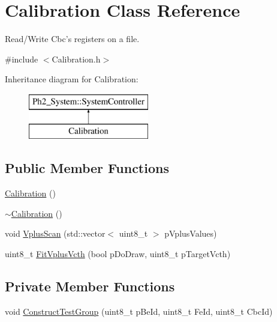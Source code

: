 \hypertarget{class_calibration}{\section{Calibration Class Reference}
\label{class_calibration}
}


Read/\-Write Cbc's registers on a file.  




{\ttfamily \#include $<$Calibration.\-h$>$}

Inheritance diagram for Calibration\-:\begin{figure}[H]
\begin{center}
\leavevmode
\includegraphics[height=2.000000cm]{class_calibration}
\end{center}
\end{figure}
\subsection*{Public Member Functions}
\begin{DoxyCompactItemize}
\item 
\hyperlink{class_calibration_a80f51a5ff7ec0f44d5388c9a61d1f20b}{Calibration} ()
\item 
\hyperlink{class_calibration_a108efb6ccd8c98e5cac950be4bf0ac26}{$\sim$\-Calibration} ()
\item 
void \hyperlink{class_calibration_afaec4580879bba485d8d174f6c4d415e}{Vplus\-Scan} (std\-::vector$<$ uint8\-\_\-t $>$ p\-Vplus\-Values)
\item 
uint8\-\_\-t \hyperlink{class_calibration_ad4f21740b432091ac2789944c26f861d}{Fit\-Vplus\-Vcth} (bool p\-Do\-Draw, uint8\-\_\-t p\-Target\-Vcth)
\end{DoxyCompactItemize}
\subsection*{Private Member Functions}
\begin{DoxyCompactItemize}
\item 
void \hyperlink{class_calibration_a9b2de26014e8ecaa48b99d39bd1d5446}{Construct\-Test\-Group} (uint8\-\_\-t p\-Be\-Id, uint8\-\_\-t Fe\-Id, uint8\-\_\-t Cbc\-Id)
\end{DoxyCompactItemize}

